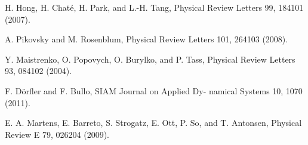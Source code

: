 \documentclass[a4paper,12pt, titlepage]{report} %
\theoremstyle{plain}
\begin{document}
\begin{thebibliography}{10}
    H. Hong, H. Chaté, H. Park, and L.-H. Tang, Physical Review Letters 99, 184101 (2007).

    A. Pikovsky and M. Rosenblum, Physical Review Letters 101, 264103 (2008).

    Y. Maistrenko, O. Popovych, O. Burylko, and P. Tass, Physical Review Letters 93, 084102 (2004).

    F. Dörfler and F. Bullo, SIAM Journal on Applied Dy- namical Systems 10, 1070 (2011).

    E. A. Martens, E. Barreto, S. Strogatz, E. Ott, P. So, and T. Antonsen, Physical Review E 79, 026204 (2009).

  \end{thebibliography}
\end{document}
